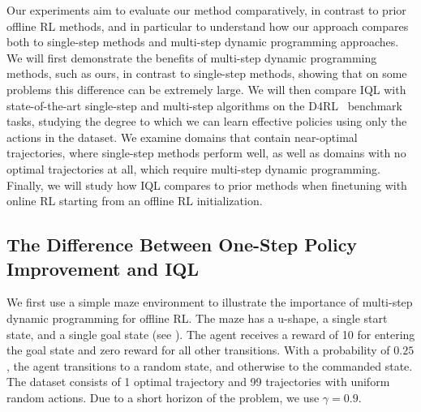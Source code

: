 \documentclass{article} %
\def\ourname{IQL\xspace}
\begin{document}
Our experiments aim to evaluate our method comparatively, in contrast to prior offline RL methods, and in particular to understand how our approach compares both to single-step methods and multi-step dynamic programming approaches. We will first demonstrate the benefits of multi-step dynamic programming methods, such as ours, in contrast to single-step methods, showing that on some problems this difference can be extremely large. We will then compare \ourname with state-of-the-art single-step and multi-step algorithms on the D4RL~\citep{fu2020d4rl} benchmark tasks, studying the degree to which we can learn effective policies using only the actions in the dataset. We examine domains that contain near-optimal trajectories, where single-step methods perform well, as well as domains with no optimal trajectories at all, which require multi-step dynamic programming. Finally, we will study how \ourname compares to prior methods when finetuning with online RL starting from an offline RL initialization.

\subsection{The Difference Between One-Step Policy Improvement and \ourname}
\label{sec:example}


We first use a simple maze environment to illustrate the importance of multi-step dynamic programming for offline RL.
The maze has a u-shape, a single start state, and a single goal state (see ).
The agent receives a reward of 10 for entering the goal state and zero reward for all other transitions. With a probability of $0.25$, the agent transitions to a random state, and otherwise to the commanded state.
The dataset consists of 1 optimal trajectory and 99 trajectories with uniform random actions.
Due to a short horizon of the problem, we use $\gamma=0.9$.
\end{document}
